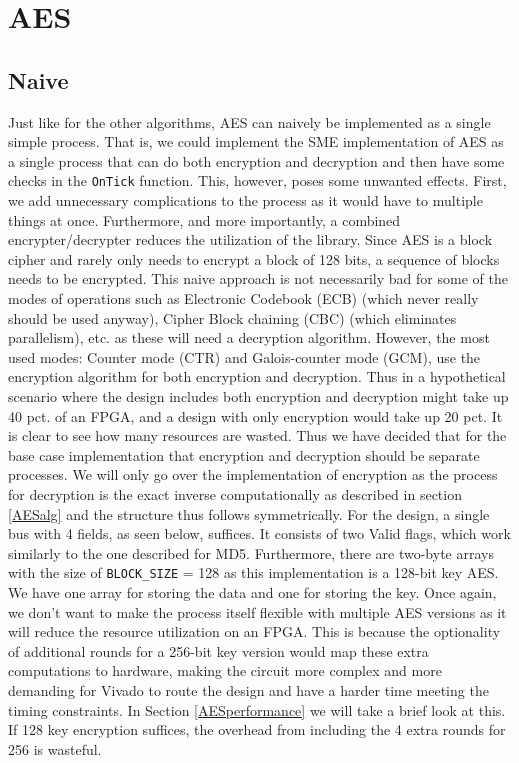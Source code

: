 \documentclass[a4paper, openany]{book}
\begin{document}
\section{AES}
\label{sec:org90d98b0}

\subsection{Naive}
\label{AESnaive}
Just like for the other algorithms, AES can naively be implemented as a single simple process. That is, we could implement the SME implementation of AES as a single process that can do both encryption and decryption and then have some checks in the \texttt{OnTick} function. This, however, poses some unwanted effects. First, we add unnecessary complications to the process as it would have to multiple things at once. Furthermore, and more importantly, a combined encrypter/decrypter reduces the utilization of the library. Since AES is a block cipher and rarely only needs to encrypt a block of 128 bits, a sequence of blocks needs to be encrypted. This naive approach is not necessarily bad for some of the modes of operations such as Electronic Codebook (ECB) (which never really should be used anyway), Cipher Block chaining (CBC) (which eliminates parallelism), etc. as these will need a decryption algorithm. However, the most used modes: Counter mode (CTR) and Galois-counter mode (GCM), use the encryption algorithm for both encryption and decryption. Thus in a hypothetical scenario where the design includes both encryption and decryption might take up 40 pct. of an FPGA, and a design with only encryption would take up 20 pct. It is clear to see how many resources are wasted. Thus we have decided that for the base case implementation that encryption and decryption should be separate processes. We will only go over the implementation of encryption as the process for decryption is the exact inverse computationally as described in section \ref{AESalg} and the structure thus follows symmetrically. For the design, a single bus with 4 fields, as seen below, suffices. It consists of two Valid flags, which work similarly to the one described for MD5.
Furthermore, there are two-byte arrays with the size of \texttt{BLOCK\_SIZE} = 128 as this implementation is a 128-bit key AES. We have one array for storing the data and one for storing the key. Once again, we don't want to make the process itself flexible with multiple AES versions as it will reduce the resource utilization on an FPGA. This is because the optionality of additional rounds for a 256-bit key version would map these extra computations to hardware, making the circuit more complex and more demanding for Vivado to route the design and have a harder time meeting the timing constraints. In Section \ref{AESperformance} we will take a brief look at this. If 128 key encryption suffices, the overhead from including the 4 extra rounds for 256 is wasteful.
\end{document}
